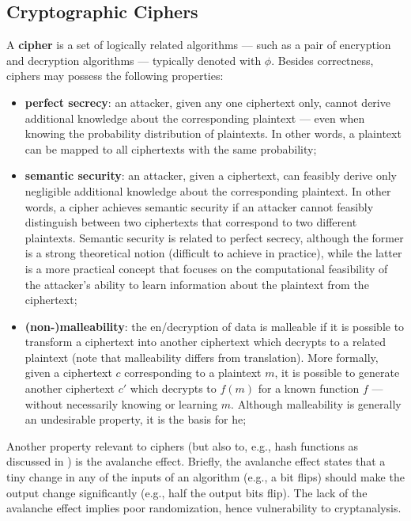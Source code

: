 \subsection{Cryptographic Ciphers}\label{sec:cryptography_basics:ciphers}

A \textbf{cipher} is a set of logically related algorithms --- such as a pair of encryption and decryption algorithms --- typically denoted with $\phi$. Besides correctness, ciphers may possess the following properties:

\begin{itemize}
	\item \textbf{perfect secrecy}: an attacker, given any one ciphertext only, cannot derive additional knowledge about the corresponding plaintext --- even when knowing the probability distribution of plaintexts. In other words, a plaintext can be mapped to all ciphertexts with the same probability;
	\item \textbf{semantic security}: an attacker, given a ciphertext, can feasibly derive only negligible additional knowledge about the corresponding plaintext. In other words, a cipher achieves semantic security if an attacker cannot feasibly distinguish between two ciphertexts that correspond to two different plaintexts. Semantic security is related to perfect secrecy, although the former is a strong theoretical notion (difficult to achieve in practice), while the latter is a more practical concept that focuses on the computational feasibility of the attacker's ability to learn information about the plaintext from the ciphertext;
	\item \textbf{(non-)malleability}: the en/decryption of data is malleable if it is possible to transform a ciphertext into another ciphertext which decrypts to a related plaintext (note that malleability differs from translation). More formally, given a ciphertext $c$ corresponding to a plaintext $m$, it is possible to generate another ciphertext $c'$ which decrypts to $f(m)$ for a known function $f$ --- without necessarily knowing or learning $m$. Although malleability is generally an undesirable property, it is the basis for \gls{he};
\end{itemize}

Another property relevant to ciphers (but also to, e.g., hash functions as discussed in ) is the avalanche effect. Briefly, the avalanche effect states that a tiny change in any of the inputs of an algorithm (e.g., a bit flips) should make the output change significantly (e.g., half the output bits flip). The lack of the avalanche effect implies poor randomization, hence vulnerability to cryptanalysis.

